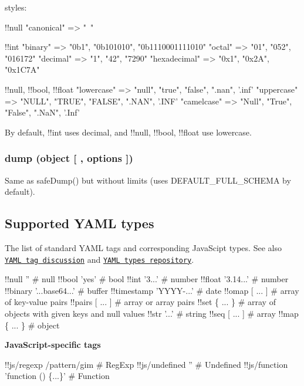 styles\+:


\begin{DoxyCode}
!!null
  "canonical"   => "~"

!!int
  "binary"      => "0b1", "0b101010", "0b1110001111010"
  "octal"       => "01", "052", "016172"
  "decimal"     => "1", "42", "7290"
  "hexadecimal" => "0x1", "0x2A", "0x1C7A"

!!null, !!bool, !!float
  "lowercase"   => "null", "true", "false", ".nan", '.inf'
  "uppercase"   => "NULL", "TRUE", "FALSE", ".NAN", '.INF'
  "camelcase"   => "Null", "True", "False", ".NaN", '.Inf'
\end{DoxyCode}


By default, !!int uses {\ttfamily decimal}, and !!null, !!bool, !!float use {\ttfamily lowercase}.

\subsubsection*{dump (object \mbox{[} , options \mbox{]})}

Same as {\ttfamily safe\+Dump()} but without limits (uses {\ttfamily D\+E\+F\+A\+U\+L\+T\+\_\+\+F\+U\+L\+L\+\_\+\+S\+C\+H\+E\+MA} by default).

\subsection*{Supported Y\+A\+ML types }

The list of standard Y\+A\+ML tags and corresponding Java\+Scipt types. See also \href{http://pyyaml.org/wiki/YAMLTagDiscussion}{\tt Y\+A\+ML tag discussion} and \href{http://yaml.org/type/}{\tt Y\+A\+ML types repository}.


\begin{DoxyCode}
!!null ''                   # null
!!bool 'yes'                # bool
!!int '3...'                # number
!!float '3.14...'           # number
!!binary '...base64...'     # buffer
!!timestamp 'YYYY-...'      # date
!!omap [ ... ]              # array of key-value pairs
!!pairs [ ... ]             # array or array pairs
!!set \{ ... \}               # array of objects with given keys and null values
!!str '...'                 # string
!!seq [ ... ]               # array
!!map \{ ... \}               # object
\end{DoxyCode}


{\bfseries Java\+Script-\/specific tags}


\begin{DoxyCode}
!!js/regexp /pattern/gim            # RegExp
!!js/undefined ''                   # Undefined
!!js/function 'function () \{...\}'   # Function
\end{DoxyCode}


